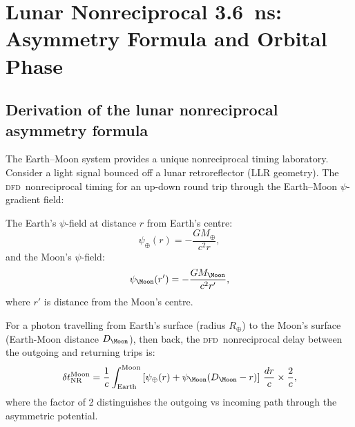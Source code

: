 \documentclass[aps,prd,twocolumn,superscriptaddress,nofootinbib,longbibliography]{revtex4-2}
\newcommand{\DFD}{\textsc{dfd}}
\begin{document}
\section{Lunar Nonreciprocal 3.6~ns: Asymmetry Formula and Orbital Phase}
\label{sec:lunar}

\subsection{Derivation of the lunar nonreciprocal asymmetry formula}

The Earth--Moon system provides a unique nonreciprocal timing laboratory.
Consider a light signal bounced off a lunar retroreflector (LLR geometry).
The \DFD\ nonreciprocal timing for an up-down round trip through the
Earth--Moon $\psi$-gradient field:

The Earth's $\psi$-field at distance $r$ from Earth's centre:
\begin{equation}
\psi_\oplus(r) = -\frac{GM_\oplus}{c^2 r},
\end{equation}
and the Moon's $\psi$-field:
\begin{equation}
\psi_\Moon(r') = -\frac{GM_\Moon}{c^2 r'},
\end{equation}
where $r'$ is distance from the Moon's centre.

For a photon travelling from Earth's surface (radius $R_\oplus$) to the
Moon's surface (Earth-Moon distance $D_\Moon$), then back, the \DFD\
nonreciprocal delay between the outgoing and returning trips is:
\begin{equation}\label{eq:lunar-NR-fundamental}
\delta t_{\rm NR}^{\rm Moon}
= \frac{1}{c}\int_{\rm Earth}^{\rm Moon}
\left[\psi_\oplus(r) + \psi_\Moon(D_\Moon - r)\right]\,\frac{dr}{c}
\times\frac{2}{c},
\end{equation}
where the factor of 2 distinguishes the outgoing vs incoming path through
the asymmetric potential.
\end{document}
